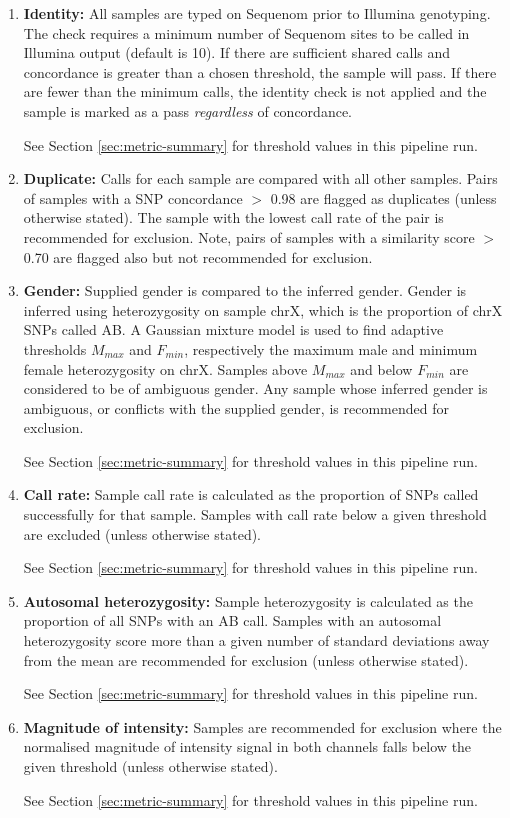 \begin{enumerate}
\item \textbf{Identity:}  All samples are typed on Sequenom prior to Illumina genotyping.  The check requires a minimum number of Sequenom sites to be called in Illumina output (default is 10). If there are sufficient shared calls and concordance is greater than a chosen threshold, the sample will pass. If there are fewer than the minimum calls, the identity check is not applied and the sample is marked as a pass \emph{regardless} of concordance.

See Section \ref{sec:metric-summary} for threshold values in this pipeline run.

\item \textbf{Duplicate:}  Calls for each sample are compared with all other samples.  Pairs of samples with a SNP concordance $>$ 0.98 are flagged as duplicates (unless otherwise stated).  The sample with the lowest call rate of the pair is recommended for exclusion.  Note, pairs of samples with a similarity score $>$ 0.70 are flagged also but not recommended for exclusion.

\item \textbf{Gender:} Supplied gender is compared to the inferred gender. Gender is inferred using heterozygosity on sample chrX, which is the proportion of chrX SNPs called AB. A Gaussian mixture model is used to find adaptive thresholds $M_{max}$ and $F_{min}$, respectively the maximum male and minimum female heterozygosity on chrX.  Samples above $M_{max}$ and below $F_{min}$ are considered to be of ambiguous gender.  Any sample whose inferred gender is ambiguous, or conflicts with the supplied gender, is recommended for exclusion.

See Section \ref{sec:metric-summary} for threshold values in this pipeline run.

\item \textbf{Call rate:} Sample call rate is calculated as the proportion of SNPs called successfully for that sample.  Samples with call rate below a given threshold are excluded (unless otherwise stated). 

See Section \ref{sec:metric-summary} for threshold values in this pipeline run.

\item \textbf{Autosomal heterozygosity:}  Sample heterozygosity is calculated as the proportion of all SNPs with an AB call.  Samples with an autosomal heterozygosity score more than a given number of standard deviations away from the mean are recommended for exclusion (unless otherwise stated).  

See Section \ref{sec:metric-summary} for threshold values in this pipeline run.

\item \textbf{Magnitude of intensity:} Samples are recommended for exclusion where the normalised magnitude of intensity signal in both channels falls below the given threshold (unless otherwise stated). 

See Section \ref{sec:metric-summary} for threshold values in this pipeline run.
\end{enumerate}
